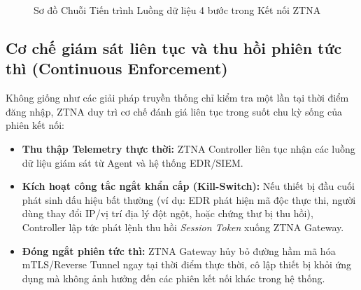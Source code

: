 \begin{figure}[htbp]
\centering
{}
\caption{Sơ đồ Chuỗi Tiến trình Luồng dữ liệu 4 bước trong Kết nối ZTNA}
\label{fig:ztna_data_flow}
\end{figure}

\subsection{Cơ chế giám sát liên tục và thu hồi phiên tức thì (Continuous Enforcement)}
\label{subsec:3_4_2}

Không giống như các giải pháp truyền thống chỉ kiểm tra một lần tại thời điểm đăng nhập, ZTNA duy trì cơ chế đánh giá liên tục trong suốt chu kỳ sống của phiên kết nối:

\begin{itemize}
    \item \textbf{Thu thập Telemetry thực thời:} ZTNA Controller liên tục nhận các luồng dữ liệu giám sát từ Agent và hệ thống EDR/SIEM.
    \item \textbf{Kích hoạt công tắc ngắt khẩn cấp (Kill-Switch):} Nếu thiết bị đầu cuối phát sinh dấu hiệu bất thường (ví dụ: EDR phát hiện mã độc thực thi, người dùng thay đổi IP/vị trí địa lý đột ngột, hoặc chứng thư bị thu hồi), Controller lập tức phát lệnh thu hồi \textit{Session Token} xuống ZTNA Gateway.
    \item \textbf{Đóng ngắt phiên tức thì:} ZTNA Gateway hủy bỏ đường hầm mã hóa mTLS/Reverse Tunnel ngay tại thời điểm thực thời, cô lập thiết bị khỏi ứng dụng mà không ảnh hưởng đến các phiên kết nối khác trong hệ thống.
\end{itemize}